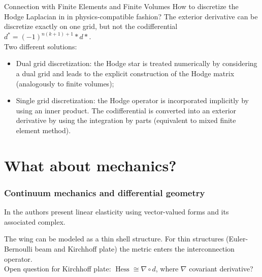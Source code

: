 \documentclass{beamer}
\DeclareMathOperator*{\Hess}{Hess}
\begin{document}
\begin{frame}{Connection with Finite Elements and Finite Volumes}
	How to discretize the Hodge Laplacian in  in physics-compatible fashion?
	The exterior derivative can be discretize exactly on one grid, but not the codifferential $d^* = (-1)^{n(k+1)+1}* d *$. \\
	
	
	Two different solutions:
	\begin{itemize}
		\item Dual grid discretization: the Hodge star is treated numerically by considering a dual grid and leads to the explicit construction of the Hodge matrix (analogously to finite volumes);
		\item Single grid discretization: the Hodge operator is incorporated implicitly by using an inner product. The codifferential is converted into an exterior derivative by using the integration by parts (equivalent to mixed finite element method).
	\end{itemize}
\end{frame}

\section{What about mechanics?}

\begin{frame}\frametitle{Continuum mechanics and differential geometry}
	In \cite{arnold2006acta} the authors present linear elasticity using vector-valued forms and its associated complex. \\
	\vspace{.5cm}
	
	 The wing can be modeled as a thin shell structure.  For thin structures (Euler-Bernoulli beam and Kirchhoff plate) the metric enters the interconnection operator.\\
	\vspace{.5cm}
	Open question for Kirchhoff plate: $\Hess \cong  \nabla \circ d$, where $\nabla$ covariant derivative? 

\end{frame}
\end{document}
